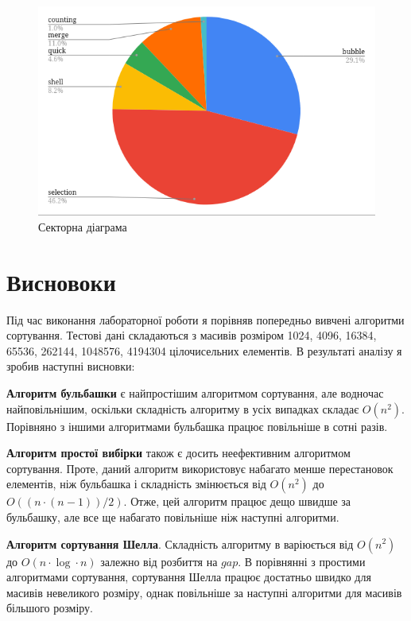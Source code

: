 \documentclass{article}
\begin{document}
\begin{normalsize}
		\begin{figure}[H]
			\centering
			\includegraphics[scale=0.5]{4}	
			\caption{Секторна діаграма}
		\end{figure}
		
		\section*{Висновоки}
		Під час виконання лабораторної роботи я порівняв попередньо вивчені алгоритми сортування. Тестові дані складаються з масивів розміром 1024, 4096, 16384,  65536, 262144, 1048576, 4194304 цілочисельних елементів. В результаті аналізу я зробив наступні висновки:
		\begin{list}{•}{}
			\item \textbf{Алгоритм бульбашки} є найпростішим алгоритмом сортування, але водночас найповільнішим, оскільки складність алгоритму в усіх випадках складає $O(n^2)$. Порівняно з іншими алгоритмами бульбашка працює повільніше в сотні разів.
			
			\item \textbf{Алгоритм простої вибірки} також є досить неефективним алгоритмом сортування. Проте, даний алгоритм використовує набагато менше перестановок елементів, ніж бульбашка і складність змінюється від $O(n^2)$ до $O((n\cdot (n-1))/2)$. Отже, цей алгоритм працює дещо швидше за бульбашку, але все ще набагато повільніше ніж наступні алгоритми.
			
			\item \textbf{Алгоритм сортування Шелла}. Складність алгоритму в варіюється від $O(n^2)$ до $O(n\cdot\log\cdot n)$ залежно від розбиття на $gap$. В порівнянні з простими алгоритмами сортування, сортування Шелла працює достатньо швидко для масивів невеликого розміру, однак повільніше за наступні алгоритми для масивів більшого розміру.
			

\end{list}
\end{normalsize}
\end{document}
